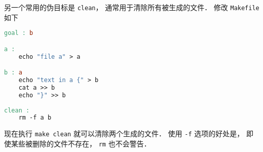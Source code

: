 另一个常用的伪目标是 \verb|clean|， 通常用于清除所有被生成的文件． 修改 \verb|Makefile| 如下
\begin{lstlisting}[language=makefile]
goal : b

a :
	echo "file a" > a

b : a
	echo "text in a {" > b
	cat a >> b
	echo "}" >> b
    
clean :
	rm -f a b
\end{lstlisting}
现在执行 \verb|make clean| 就可以清除两个生成的文件． 使用 \verb|-f| 选项的好处是， 即使某些被删除的文件不存在， \verb|rm| 也不会警告．
